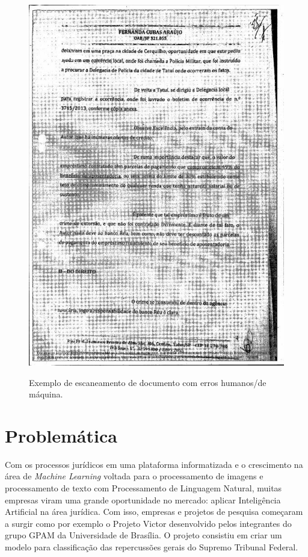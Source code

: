 \begin{figure}[H]
    \centering
    \caption{Exemplo de escaneamento de documento com erros humanos/de máquina.}
    \includegraphics[scale=0.3]{figuras/badly-scanned-image.jpg}
    \label{fig:badly-scanned-image}
\end{figure}

\section{Problemática}

Com os processos jurídicos em uma plataforma informatizada e o crescimento na área de \textit{Machine Learning} voltada para o processamento de imagens e processamento de texto com Processamento de Linguagem Natural, muitas empresas viram uma grande oportunidade no mercado: aplicar Inteligência Artificial na área jurídica. Com isso, empresas e projetos de pesquisa começaram a surgir como por exemplo o Projeto Victor \cite{cnn-for-STF} desenvolvido pelos integrantes do grupo GPAM da Universidade de Brasília. O projeto consistiu em criar um modelo para classificação das repercussões gerais do Supremo Tribunal Federal.

